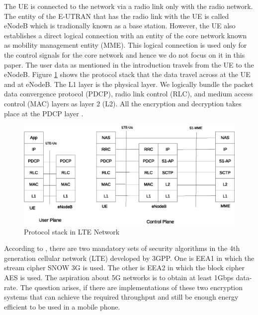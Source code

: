 \documentclass[lnicst,sechang,a4paper]{svmultln}
\begin{document}
The UE is connected to the network via a radio link only with the radio network. The entity of the E-UTRAN that has the radio link with the UE is called eNodeB which is tradionally known as a base station. However, the UE also establishes a direct logical connection with an entity of the core network known as mobility management entity (MME). This logical connection is used only for the control signals for the core network and hence we do not focus on it in this paper. The user data as mentioned in the introduction travels from the UE to the eNodeB. Figure \ref{fig:protocl_stack} shows the protocol stack that the data travel across at the UE and at eNodeB. The L1 layer is the physical layer. We logically bundle the packet data convergence protocol (PDCP), radio link control (RLC), and medium access control (MAC) layers as layer 2 (L2). All the encryption and decryption takes place at the PDCP layer \cite{3GPP_TS_36_323}.

\begin{figure}
\begin{center}
  \includegraphics[width=.98\textwidth]{protocol_stack.eps}
\caption{Protocol stack in LTE Network}
\label{fig:protocl_stack}       %
\end{center}
\end{figure}

According to \cite{3GPP_TS_33_401}, there are two mandatory sets of security algorithms in the 4th generation cellular network (LTE) developed by 3GPP. One is EEA1 in which the stream cipher SNOW 3G is used. The other is EEA2 in which the block cipher AES is used. The aspiration about 5G networks is to obtain at least 1Gbps data-rate. The question arises, if there are implementations of these two encryption systems that can achieve the required throughput and still be enough energy efficient to be used in a mobile phone.
\end{document}
